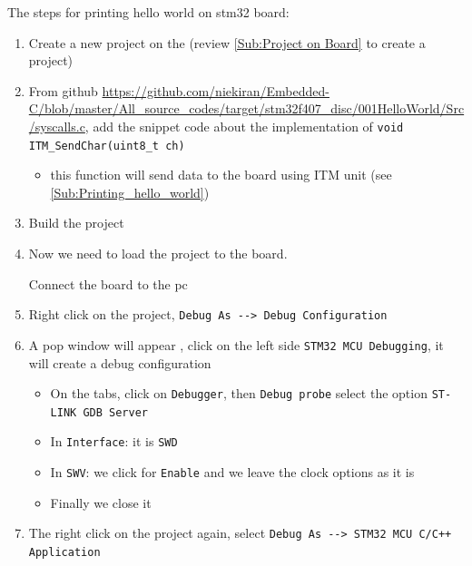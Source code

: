 The steps for printing hello world on stm32 board:

\begin{enumerate}

    \item Create a new project on the  (review \autoref{Sub:Project on Board} to create a project)
    
    \item From github \url{https://github.com/niekiran/Embedded-C/blob/master/All_source_codes/target/stm32f407_disc/001HelloWorld/Src/syscalls.c}, add the snippet code about the implementation of \verb|void ITM_SendChar(uint8_t ch)|
    
    \begin{itemize}
        \item this function will send data to the board using ITM unit (see \autoref{Sub:Printing_hello_world})
    \end{itemize}
    
    \item Build the project 
    
    \item Now we need to load the project to the board.
    
    Connect the board to the pc
    
    \item Right click on the project, \verb|Debug As --> Debug Configuration|
    
    \item A pop window will appear , click on the left side \verb|STM32 MCU Debugging|, it will create a debug configuration
    
    \begin{itemize}
        \item On the tabs, click on \verb|Debugger|, then \verb|Debug probe| select the option \verb|ST-LINK GDB Server|
        
        \item In \verb|Interface|: it is \verb|SWD|
        
        \item In \verb|SWV|: we click for \verb|Enable| and we leave the clock options as it is
        
        \item Finally we close it
        
    \end{itemize}
    
    \newpage
    \item The right click on the project again, select \verb|Debug As --> STM32 MCU C/C++ Application|
    

\end{enumerate}
